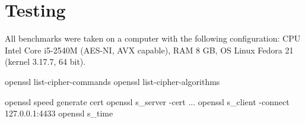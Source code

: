 \section{Testing}


All benchmarks were taken on a computer with the following configuration: CPU Intel Core i5-2540M (AES-NI, AVX capable), RAM 8 GB, OS Linux Fedora 21 (kernel 3.17.7, 64 bit).

openssl list-cipher-commands
openssl list-cipher-algorithms

openssl speed
generate cert
openssl s\_server -cert ...
openssl s\_client -connect 127.0.0.1:4433
openssl s\_time
